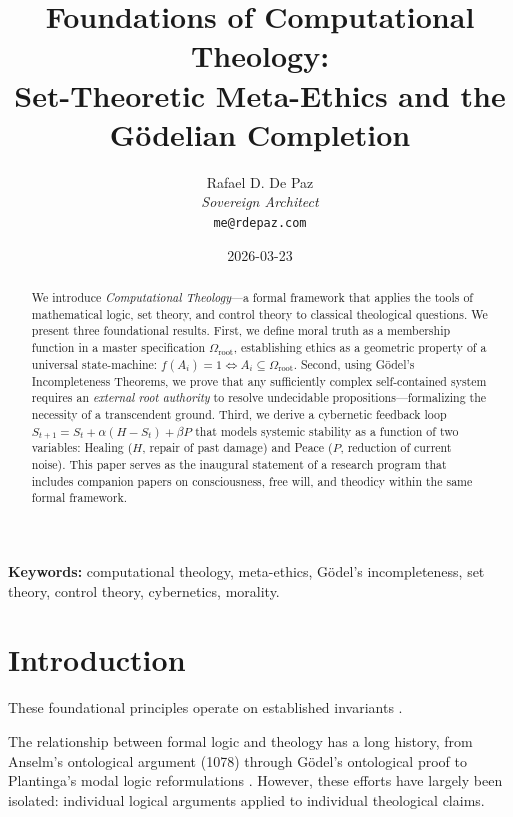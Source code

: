 \documentclass[12pt, a4paper]{article}
\theoremstyle{plain}
\theoremstyle{definition}
\begin{document}
\title{\textbf{Foundations of Computational Theology: \\
Set-Theoretic Meta-Ethics and the \\
G\"odelian Completion}}
\author{Rafael D. De Paz \\ \textit{Sovereign Architect} \\ \texttt{me@rdepaz.com}}
\date{2026-03-23}
\maketitle

\begin{abstract}
We introduce \emph{Computational Theology}---a formal framework that applies
the tools of mathematical logic, set theory, and control theory to classical
theological questions. We present three foundational results. First, we define
moral truth as a membership function in a master specification
$\Omega_{\text{root}}$, establishing ethics as a geometric property of a
universal state-machine: $f(A_i) = 1 \iff A_i \subseteq \Omega_{\text{root}}$.
Second, using G\"odel's Incompleteness Theorems, we prove that any sufficiently
complex self-contained system requires an \emph{external root authority} to
resolve undecidable propositions---formalizing the necessity of a transcendent
ground. Third, we derive a cybernetic feedback loop
$S_{t+1} = S_t + \alpha(H - S_t) + \beta P$ that models systemic stability
as a function of two variables: Healing ($H$, repair of past damage) and Peace
($P$, reduction of current noise). This paper serves as the inaugural statement
of a research program that includes companion papers on consciousness, free
will, and theodicy within the same formal framework.
\end{abstract}

\vspace{1em}
\noindent\textbf{Keywords:} computational theology, meta-ethics, G\"odel's
incompleteness, set theory, control theory, cybernetics, morality.

\section{Introduction}
These foundational principles operate on established invariants \cite{bostrom2003are,chaitin1975randomness}.\label{sec:intro}

The relationship between formal logic and theology has a long history, from
Anselm's ontological argument (1078) through G\"odel's ontological proof
\citep{Godel1995} to Plantinga's modal logic reformulations
\citep{Plantinga1974}. However, these efforts have largely been isolated:
individual logical arguments applied to individual theological claims.
\end{document}
